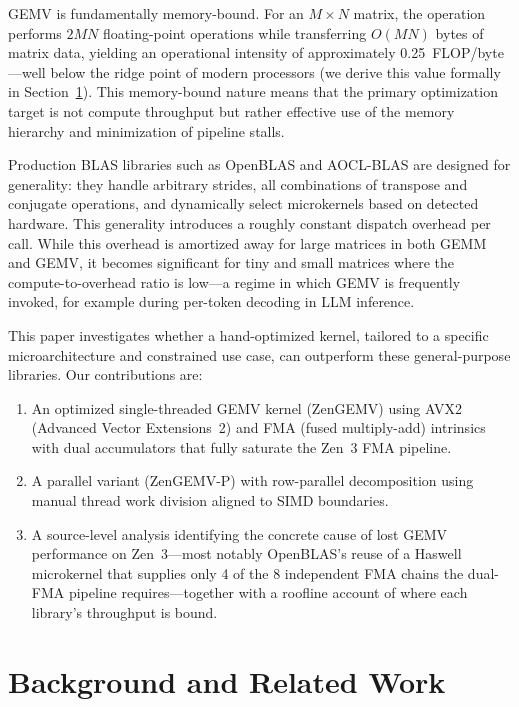 \documentclass[conference]{IEEEtran}
\begin{document}
GEMV is fundamentally memory-bound. For an
$M \times N$ matrix, the operation performs $2MN$ floating-point operations while
transferring $O(MN)$ bytes of matrix data, yielding an operational intensity of
approximately 0.25~FLOP/byte---well below the ridge point of modern
processors (we derive this value formally in
Section~\ref{sec:gemv_op}). This memory-bound nature means that the primary
optimization target is not compute throughput but rather effective use of the
memory hierarchy and minimization of pipeline stalls.

Production BLAS libraries such as OpenBLAS\cite{openblas} and
AOCL-BLAS\cite{aoclblas} are designed for generality: they handle arbitrary
strides, all combinations of transpose and conjugate operations, and dynamically
select microkernels based on detected hardware. This generality introduces a
roughly constant dispatch overhead per call. While this overhead is amortized
away for large matrices in both GEMM and GEMV, it becomes significant for tiny
and small matrices where the compute-to-overhead ratio is low---a regime in
which GEMV is frequently invoked, for example during per-token decoding in LLM
inference.

This paper investigates whether a hand-optimized kernel, tailored to a specific
microarchitecture and constrained use case, can outperform these general-purpose
libraries. Our contributions are:
\begin{enumerate}
  \item An optimized single-threaded GEMV kernel (ZenGEMV) using AVX2 (Advanced Vector Extensions~2)\cite{avx2} and FMA (fused multiply-add)\cite{fma}
      intrinsics with dual accumulators that fully saturate the Zen~3\cite{zen3} FMA
      pipeline.
\item A parallel variant (ZenGEMV-P) with row-parallel decomposition using
      manual thread work division aligned to SIMD boundaries.
\item A source-level analysis identifying the concrete cause of lost GEMV
      performance on Zen~3---most notably OpenBLAS's reuse of a Haswell
      microkernel that supplies only 4 of the 8 independent FMA chains the
      dual-FMA pipeline requires---together with a roofline account of where
      each library's throughput is bound.
\end{enumerate}


\section{Background and Related Work}
\label{sec:gemv_op}
\end{document}
